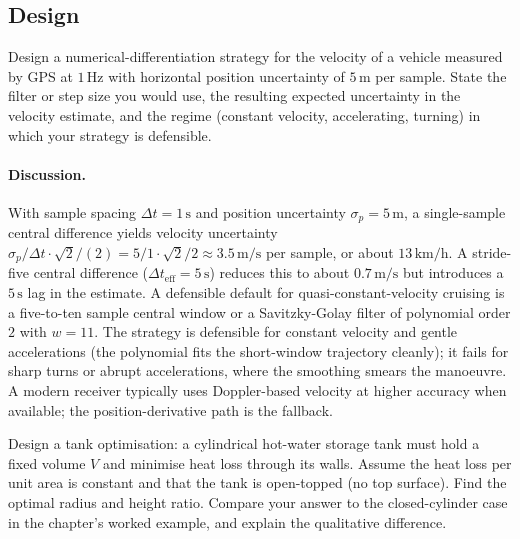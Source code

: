 \subsection*{Design}

\begin{exercise}
Design a numerical-differentiation strategy for the velocity of a
vehicle measured by GPS at $1\,\si{\hertz}$ with horizontal
position uncertainty of $5\,\si{\meter}$ per sample. State the
filter or step size you would use, the resulting expected
uncertainty in the velocity estimate, and the regime (constant
velocity, accelerating, turning) in which your strategy is
defensible.
\end{exercise}

\paragraph{Discussion.}
With sample spacing $\Delta t = 1 \,\si{\second}$ and position
uncertainty $\sigma_{p} = 5 \,\si{\meter}$, a single-sample
central difference yields velocity uncertainty $\sigma_{p} /
\Delta t \cdot \sqrt{2} / (2) = 5 / 1 \cdot \sqrt{2}/2 \approx
3.5 \,\si{\meter\per\second}$ per sample, or about $13 \,\si
{\kilo\meter\per\hour}$. A stride-five central difference
($\Delta t_{\text{eff}} = 5 \,\si{\second}$) reduces this to
about $0.7 \,\si{\meter\per\second}$ but introduces a $5 \,\si
{\second}$ lag in the estimate. A defensible default for
quasi-constant-velocity cruising is a five-to-ten sample
central window or a Savitzky-Golay filter of polynomial order
$2$ with $w = 11$. The strategy is defensible for constant
velocity and gentle accelerations (the polynomial fits the
short-window trajectory cleanly); it fails for sharp turns or
abrupt accelerations, where the smoothing smears the manoeuvre.
A modern receiver typically uses Doppler-based velocity at
higher accuracy when available; the position-derivative path is
the fallback.

\begin{exercise}
Design a tank optimisation: a cylindrical hot-water storage tank
must hold a fixed volume $V$ and minimise heat loss through its
walls. Assume the heat loss per unit area is constant and that
the tank is open-topped (no top surface). Find the optimal radius
and height ratio. Compare your answer to the closed-cylinder case
in the chapter's worked example, and explain the qualitative
difference.
\end{exercise}

